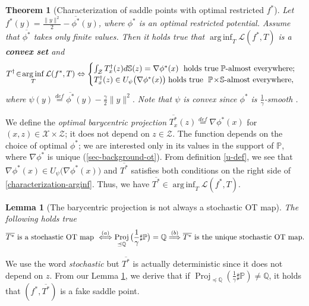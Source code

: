 \documentclass{article} %
\DeclareMathOperator*{\arginf}{arg\,inf}
\DeclareMathOperator{\Proj}{Proj}
\newtheorem{theorem}{Theorem}
\newtheorem{lemma}{Lemma}
\begin{document}
\begin{theorem}[Characterization of saddle points with optimal restricted $f^{*}$] Let $f^{*}(y)=\frac{\|y\|^{2}}{2}-\overline{\phi^{*}}(y)$, where $\phi^{*}$ is an optimal restricted potential. Assume that $\overline{\phi^{*}}$ takes only finite values. Then it holds true that $\arginf_{T}\mathcal{L}(f^{*},T)$ is a {\textbf{convex set}} and
\begin{equation}T^{\dagger}\!\in\! \arginf_{T}\mathcal{L}(f^{*},T)\Leftrightarrow 
\begin{cases}
   \int_{\mathcal{Z}} T_{x}^{\dagger}(z)d\mathbb{S}(z)=\nabla\phi^{*}(x)\hspace{1mm}\mbox{ holds true}\hspace{1mm} \mathbb{P}\mbox{-almost everywhere};\\
    T_{x}^{\dagger}(z)\in U_{\psi}\big(\nabla\phi^{*}(x)\big) \hspace{1mm}\text{holds true }\hspace{1mm}\mathbb{P}\!\times\!\mathbb{S}\mbox{-almost everywhere},
            \end{cases}
\label{characterization-arginf}
\vspace{-2mm}
\end{equation}
where $\psi(y)\stackrel{def}{=}\overline{\phi^{*}}(y)-\frac{\gamma}{2}\|y\|^{2}.$ Note that $\psi$ is convex since $\phi^{*}$ is $\frac{1}{\gamma}$-smooth \citep{kakade2009duality}.
\label{lemma-characterization}\vspace{-3mm}
\end{theorem}
We define the \textit{optimal barycentric projection} $\overline{T^{*}_{x}}(z)\stackrel{def}{=}\nabla\phi^{*}(x)$ for $(x,z)\!\in\!\mathcal{X}\!\times\!\mathcal{Z}$; it does not depend on $z\!\in\!\mathcal{Z}$. The function depends on the choice of optimal $\phi^{*}$; we are interested only in its values in the support of $\mathbb{P}$, where $\nabla\phi^{*}$ is unique (\wasyparagraph\ref{sec-background-ot}). From definition \eqref{u-def}, we see that $\nabla\phi^{*}(x)\in U_{\psi}\big(\nabla\phi^{*}(x)\big)$ and $\overline{T^{*}}$ satisfies both conditions on the right side of \eqref{characterization-arginf}. Thus, we have $\overline{T^{*}}\in\arginf_{T}\mathcal{L}(f^{*},T)$. 
\begin{lemma}[The barycentric projection is not always a stochastic OT map] \label{lemma-is-bar-optimal}The following holds true
\begin{equation}\overline{T^{*}} \mbox{ is a stochastic OT map }\stackrel{(a)}{\Longleftrightarrow} \Proj_{\preceq\mathbb{Q}}\big(\frac{1}{\gamma}\sharp\mathbb{P}\big)=\mathbb{Q}\stackrel{(b)}{\Longrightarrow}  \overline{T^{*}} \mbox{ is the unique stochastic OT map.}\nonumber
\vspace{-2mm}\end{equation}
\end{lemma}
We use the word \textit{stochastic} but $\overline{T^{*}}$ is actually deterministic since it does not depend on $z$. From our Lemma \ref{lemma-is-bar-optimal}, we derive that if $\Proj_{\preceq\mathbb{Q}}(\frac{1}{\gamma}\sharp\mathbb{P})\neq \mathbb{Q}$, it holds that $(f^{*},\overline{T^{*}})$ is a fake saddle point.
\end{document}
